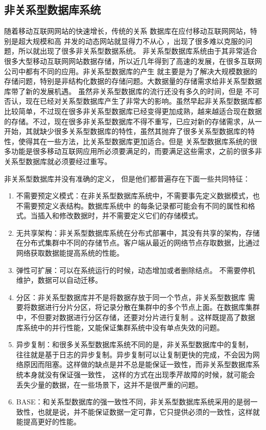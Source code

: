 \subsection{非关系型数据库系统}
随着移动互联网网站的快速增长，传统的关系
数据库在应付移动互联网网站，特别是超大规模和高
并发的动态网站就显得力不从心
，出现了很多难以克服的问题，所以就出现了很多非关系型数据系统。
非关系型数据库系统由于其非常适合很多大型移动互联网网站数据存储，所以近几年得到了高速的发展，在很多互联网公司中都有不同的应用。非关系型数据库的产生
就主要是为了解决大规模数据的存储问题，特别是非结构化数据的存储问题。大数据量的存储需求给非关系型数据库带了新的发展机遇。
虽然非关系型数据库的流行还没有多久的时间，但是
不可否认，现在已经对关系型数据库产生了非常大的影响。虽然早起非关系型数据库都比较简单，不过现在很多非关系型数据库已经变得更加成熟，越来越适合现在数据的存储。不过，现在很多非关系型数据库不得不重写，已应对新的存储需求，从一开始，其就缺少很多关系型数据库的特性，虽然其抛弃了很多关系型数据库的特性，使得其在一些方法，比关系型数据库更加适合。但是
关系型数据库系统的很多功能是很多移动互联网应用所必须要满足的，而要满足这些需求，之前的很多非关系型数据库就必须要经过重写。

非关系型数据库并没有准确的定义，
但是他们都普遍存在下面一些共同特征：
\begin{enumerate}[fullwidth,itemindent=2em]
	\item   不需要预定义模式：在非关系型数据库系统中，不需要事先定义数据模式，也不需要预定义表结构。数据库系统中
	的每条记录都可能会有不同的属性和格式。当插入和修改数据时，并不需要定义它们的存储模式。
\item 	无共享架构：非关系型数据库系统在分布式部署中，其没有共享的架构，存储在分布式集群中不同的存储节点。客户端从最近的网络节点存取数据，比通过网络获取数据能提高系统的性能。
\item 	弹性可扩展：可以在系统运行的时候，动态增加或者删除结点。
不需要停机维护，数据可以自动迁移。
\item 	分区：非关系型数据库并不是将数据存放于同一个节点，非关系型数据库
需要将数据进行分片分区，将记录分散在集群中的多个节点上面。在数据库集群中，不但要对数据进行分区存储，还要对分片进行复制
。这样既提高了数据库系统中的并行性能，又能保证集群系统中没有单点失效的问题。
\item 	异步复制：和很多关系型数据库系统不同的是，非关系型数据库中的复制，
往往就是基于日志的异步复制。异步复制可以让复制更快的完成，不会因为网络原因而阻塞。这样做的缺点是并不总是能保证一致性，而非关系型数据库系统本身就没有保证强一致性，
这样的方式在出现季芹故障的时候，就可能会丢失少量的数据，在一些场景下，这并不是很严重的问题。
\item 	BASE：和关系型数据库的强一致性不同，非关系型数据库系统采用的是弱一致性，也就是说，并不能保证数据一定可靠，它只提供必须的一致性，这样就能提高更好的性能。
\end{enumerate}
